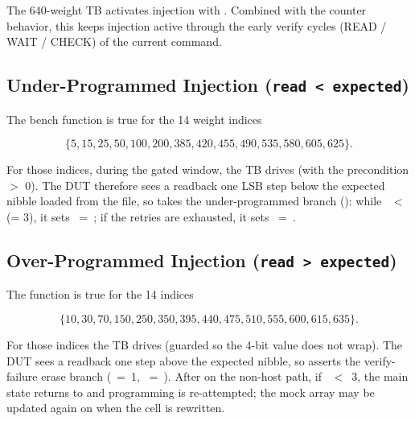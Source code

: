 The 640-weight TB activates injection with
.
Combined with the counter behavior, this keeps injection active through
the early verify cycles (READ / WAIT / CHECK) of the current command.

\subsection{Under-Programmed Injection (\texttt{read < expected})}
\label{sec:verif-injection-under}

The bench function  is true for the 14
weight indices

\[
    \{5, 15, 25, 50, 100, 200, 385, 420, 455, 490, 535, 580, 605, 625\}.
\]

For those indices, during the gated window, the TB drives
(with the precondition  \(>\) 0). The DUT therefore
sees a readback one LSB step below the expected nibble loaded from the
file, so  takes the under-programmed branch
(): while
~\(<\)~ (= 3), it sets
~=~; if the retries are
exhausted, it sets ~=~.

\subsection{Over-Programmed Injection (\texttt{read > expected})}
\label{sec:verif-injection-over}

The function  is true for the 14 indices

\[
    \{10, 30, 70, 150, 250, 350, 395, 440, 475, 510, 555, 600, 615, 635\}.
\]

For those indices the TB drives
(guarded so the 4-bit value does not wrap). The DUT sees a readback one
step above the expected nibble, so  asserts the
verify-failure erase branch
(~=~1,
~=~). After 
on the non-host path, if ~\(<\)~3, the main state
returns to  and programming is re-attempted; the
mock array may be updated again on  when
the cell is rewritten.

